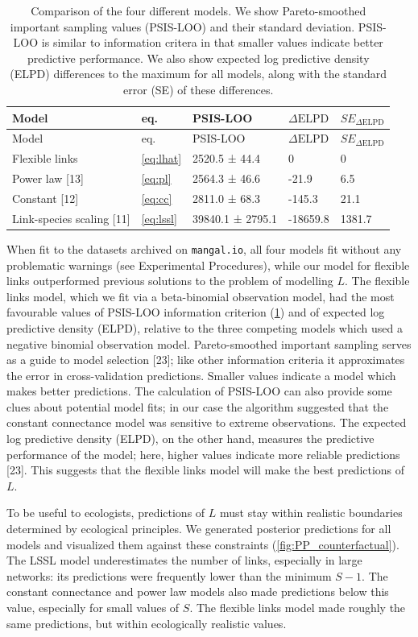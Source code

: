 \documentclass[12pt]{article}
\begin{document}
\begin{longtable}[]{@{}lllll@{}}
\caption{Comparison of the four different models. We show
Pareto-smoothed important sampling values (PSIS-LOO) and their standard
deviation. PSIS-LOO is similar to information critera in that smaller
values indicate better predictive performance. We also show expected log
predictive density (ELPD) differences to the maximum for all models,
along with the standard error (SE) of these differences.
\label{tbl:comparison}}\tabularnewline
\toprule
Model & eq. & PSIS-LOO & \(\Delta \text{ELPD}\) &
\(SE_{\Delta \text{ELPD}}\)\tabularnewline
\midrule
\endfirsthead
\toprule
Model & eq. & PSIS-LOO & \(\Delta \text{ELPD}\) &
\(SE_{\Delta \text{ELPD}}\)\tabularnewline
\midrule
\endhead
Flexible links & \ref{eq:lhat} & 2520.5 ± 44.4 & 0 & 0\tabularnewline
Power law {[}13{]} & \ref{eq:pl} & 2564.3 ± 46.6 & -21.9 &
6.5\tabularnewline
Constant {[}12{]} & \ref{eq:cc} & 2811.0 ± 68.3 & -145.3 &
21.1\tabularnewline
Link-species scaling {[}11{]} & \ref{eq:lssl} & 39840.1 ± 2795.1 &
-18659.8 & 1381.7\tabularnewline
\bottomrule
\end{longtable}

When fit to the datasets archived on \texttt{mangal.io}, all four models
fit without any problematic warnings (see Experimental Procedures),
while our model for flexible links outperformed previous solutions to
the problem of modelling \(L\). The flexible links model, which we fit
via a beta-binomial observation model, had the most favourable values of
PSIS-LOO information criterion (\cref{tbl:comparison}) and of expected
log predictive density (ELPD), relative to the three competing models
which used a negative binomial observation model. Pareto-smoothed
important sampling serves as a guide to model selection {[}23{]}; like
other information criteria it approximates the error in cross-validation
predictions. Smaller values indicate a model which makes better
predictions. The calculation of PSIS-LOO can also provide some clues
about potential model fits; in our case the algorithm suggested that the
constant connectance model was sensitive to extreme observations. The
expected log predictive density (ELPD), on the other hand, measures the
predictive performance of the model; here, higher values indicate more
reliable predictions {[}23{]}. This suggests that the flexible links
model will make the best predictions of \(L\).

To be useful to ecologists, predictions of \(L\) must stay within
realistic boundaries determined by ecological principles. We generated
posterior predictions for all models and visualized them against these
constraints (\cref{fig:PP_counterfactual}). The LSSL model
underestimates the number of links, especially in large networks: its
predictions were frequently lower than the minimum \(S-1\). The constant
connectance and power law models also made predictions below this value,
especially for small values of \(S\). The flexible links model made
roughly the same predictions, but within ecologically realistic values.
\end{document}
